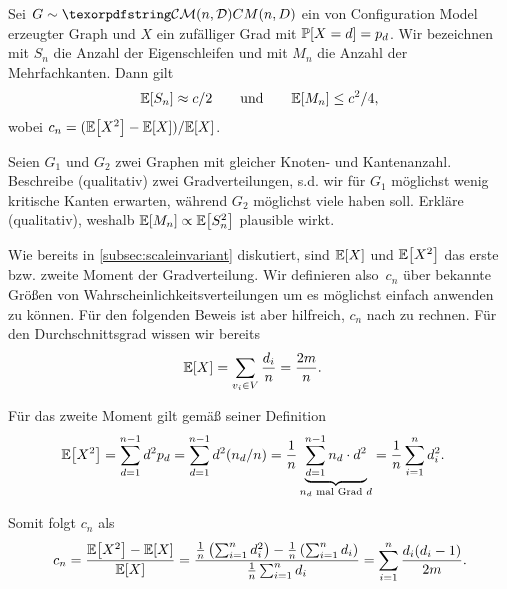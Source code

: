 \begin{lemma}\label{lem:cm_anzahl_nicht_einfach}
    Sei $G \follows \CMnd$ ein von Configuration Model erzeugter Graph und $X$ ein zufälliger Grad mit $\mathbb{P}\!\left[X = d\right] = p_d$.
    Wir bezeichnen mit $S_n$ die Anzahl der Eigenschleifen und mit $M_n$ die Anzahl der Mehrfachkanten.
    Dann gilt
    \begin{align}
        \mathbb{E}\!\left[S_n\right] \approx c/2 \qquad \text{und} \qquad \mathbb{E}\!\left[M_n\right] \le c^2 / 4,
    \end{align}
    wobei $c_n = (\mathbb{E}\!\left[X^2\right] - \mathbb{E}\!\left[X\right]) / \mathbb{E}\!\left[X\right]$.
\end{lemma}

\begin{exercise}
    Seien $G_1$ und $G_2$ zwei Graphen mit gleicher Knoten- und Kantenanzahl.
    Beschreibe (qualitativ) zwei Gradverteilungen, s.d. wir für $G_1$ möglichst wenig kritische Kanten erwarten, während $G_2$ möglichst viele haben soll.
    Erkläre (qualitativ), weshalb $\mathbb{E}\!\left[M_n\right] \propto \mathbb{E}\!\left[S_n^2\right]$ plausible wirkt.
\end{exercise}

\begin{remark}
    Wie bereits in \cref{subsec:scaleinvariant} diskutiert, sind $\mathbb{E}\!\left[X\right]$ und $\mathbb{E}\!\left[X^2\right]$ das erste bzw. zweite Moment der Gradverteilung.
    Wir definieren also~$c_n$ über bekannte Größen von Wahrscheinlichkeitsverteilungen um es möglichst einfach anwenden zu können.
    Für den folgenden Beweis ist aber hilfreich, $c_n$ nach zu rechnen.
    Für den Durchschnittsgrad wissen wir bereits
    \begin{align}
        \mathbb{E}\!\left[X\right] & = \sum_{v_i \in V} \frac{d_i}{n} = \frac {2m}{n}.
    \end{align}

    \noindent
    Für das zweite Moment gilt gemäß seiner Definition
    \begin{align}
        \mathbb{E}\!\left[X^2\right]
         & = \sum_{d=1}^{n-1} d^2 p_d
        = \sum_{d=1}^{n-1} d^2 (n_d / n)
        = \frac 1 n \underbrace{\sum_{d=1}^{n-1} n_d \cdot d^2}_\text{$n_d$ mal Grad $d$}
        = \frac 1 n \sum_{i=1}^n d_i^2.
    \end{align}

    \noindent
    Somit folgt $c_n$ als
    \begin{align}
        c_n
        = \frac{\mathbb{E}\!\left[X^2\right] - \mathbb{E}\!\left[X\right]}{\mathbb{E}\!\left[X\right]}
        = \frac{ \frac 1 n \left(\sum_{i=1}^n d_i^2\right) - \frac 1 n \left(\sum_{i=1}^n d_i\right)}{\frac 1 n \sum_{i=1}^n d_i}
        = \sum_{i=1}^n \frac{d_i (d_i - 1)}{2m}.
    \end{align}
\end{remark}

